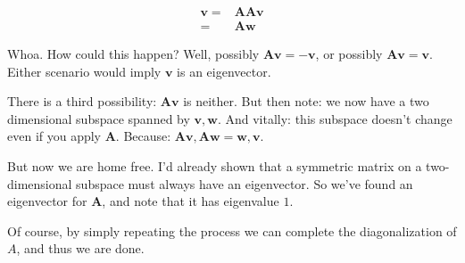 \documentclass[11pt, oneside]{amsart}
\newcommand{\mtx}[1]{\bm{#1}}
\renewcommand{\vec}[1]{\mathbf{#1}}
\newcommand{\mtxA}{\mtx{A}}
\newcommand{\vecv}{\vec{v}}
\newcommand{\vecw}{\vec{w}}
\begin{document}
\begin{equation*}
  \begin{split}
    \vecv ={}& \mtxA\mtxA\vecv
    \\
    ={}& \mtxA\vecw
  \end{split}
\end{equation*}

Whoa. How could this happen? Well, possibly $\mtxA\vecv = -\vecv$, or
possibly $\mtxA\vecv = \vecv$. Either scenario would imply $\vecv$ is
an eigenvector.

There is a third possibility: $\mtxA\vecv$ is neither. But then note:
we now have a two dimensional subspace spanned by $\vecv, \vecw$. And
vitally: this subspace doesn't change even if you apply
$\mtxA$. Because: $\mtxA\vecv, \mtxA\vecw = \vecw, \vecv$.

But now we are home free. I'd already shown that a symmetric matrix on
a two-dimensional subspace must always have an eigenvector. So we've
found an eigenvector for $\mtxA$, and note that it has eigenvalue $1$.

Of course, by simply repeating the process we can complete the
diagonalization of $A$, and thus we are done.
\end{document}
